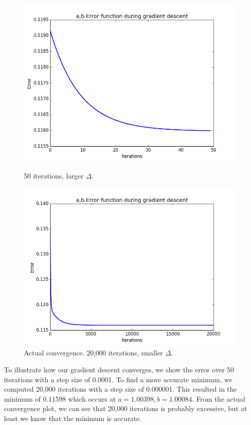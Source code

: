 \documentclass{article}
\begin{document}
\\
\begin{figure}[H]
  \centering
  \begin{minipage}[t]{0.49\textwidth}
    \includegraphics[width=\textwidth]{exercise6/ab_descent_illustration.png}
    \caption*{50 iterations, larger $\Delta$.}
  \end{minipage}
  \begin{minipage}[t]{0.49\textwidth}
    \includegraphics[width=\textwidth]{exercise6/ab_descent_actual.png}
    \caption*{Actual convergence. 20,000 iterations, smaller $\Delta$.}
  \end{minipage}
\end{figure}
To illustrate how our gradient descent converges, we show the error over 50 iterations with a step size of 0.0001.
To find a more accurate minimum, we computed 20,000 iterations with a step size of 0.000001.
This resulted in the minimum of 0.11598 which occurs at $a=1.00398, b=1.00084$.
From the actual convergence plot, we can see that 20,000 iterations is probably excessive, but at least we know that the minimum is accurate.
\end{document}
